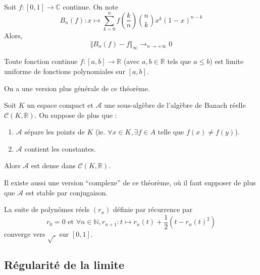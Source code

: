 
  \begin{theorem}
    Soit $f : [0,1] \rightarrow \mathbb{C}$ continue. On note
    \[ B_n(f) : x \mapsto \sum_{k=0}^{n} f\left(\frac{k}{n}\right) \binom{n}{k} x^k (1-x)^{n-k} \]
    Alors,
    \[ \Vert B_n(f) - f \Vert_\infty \longrightarrow_{n \rightarrow +\infty} 0 \]
  \end{theorem}


  \begin{corollary}
    Toute fonction continue $f : [a,b] \rightarrow \mathbb{R}$ (avec $a, b \in \mathbb{R}$ tels que $a \leq b$) est limite uniforme de fonctions polynomiales sur $[a, b]$.
  \end{corollary}

  On a une version plus générale de ce théorème.


  \begin{theorem}
    Soit $K$ un espace compact et $\mathcal{A}$ une sous-algèbre de l'algèbre de Banach réelle $\mathcal{C}(K, \mathbb{R})$. On suppose de plus que :
    \begin{enumerate}[label={\bfseries(\roman*)}]
      \item $\mathcal{A}$ sépare les points de $K$ (ie. $\forall x \in K, \exists f \in A \text{ telle que } f(x) \neq f(y)$).
      \item $\mathcal{A}$ contient les constantes.
    \end{enumerate}
    Alors $\mathcal{A}$ est dense dans $\mathcal{C}(K, \mathbb{R})$.
  \end{theorem}

  \begin{remark}
    Il existe aussi une version ``complexe'' de ce théorème, où il faut supposer de plus que $\mathcal{A}$ est stable par conjugaison.
  \end{remark}

  \begin{example}
    La suite de polynômes réels $(r_n)$ définie par récurrence par
    \[ r_0 = 0 \text{ et } \forall n \in \mathbb{N}, r_{n+1} : t \mapsto r_n(t) + \frac{1}{2} (t - r_n(t)^2) \]
    converge vers $\sqrt{.}$ sur $[0,1]$.
  \end{example}

  \subsection{Régularité de la limite}

